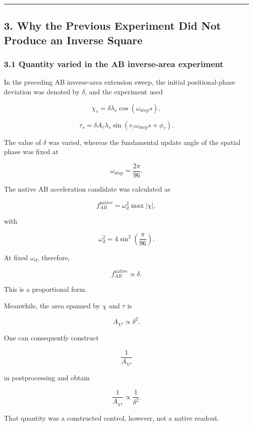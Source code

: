 \documentclass[
  10pt,
  a4paper,
]{article}
\begin{document}
\begin{center}\rule{0.5\linewidth}{0.5pt}\end{center}

\subsection{3. Why the Previous Experiment Did Not Produce an Inverse
Square}\label{why-the-previous-experiment-did-not-produce-an-inverse-square}

\subsubsection{3.1 Quantity varied in the AB inverse-area
experiment}\label{quantity-varied-in-the-ab-inverse-area-experiment}

In the preceding AB inverse-area extension sweep, the initial
positional-phase deviation was denoted by \(\delta\), and the experiment
used

\[
\chi_s
=\delta\lambda_s\cos(\omega_{\mathrm{step}}s),
\]

\[
\tau_s
=\delta A_\tau\lambda_s
\sin(r_\tau\omega_{\mathrm{step}}s+\phi_\tau).
\]

The value of \(\delta\) was varied, whereas the fundamental update angle
of the spatial phase was fixed at

\[
\omega_{\mathrm{step}}
=\frac{2\pi}{96}.
\]

The native AB acceleration candidate was calculated as

\[
f_{AB}^{\mathrm{native}}
=\omega_d^2\max|\chi|,
\]

with

\[
\omega_d^2
=4\sin^2\left(\frac{\pi}{96}\right).
\]

At fixed \(\omega_d\), therefore,

\[
f_{AB}^{\mathrm{native}}\propto\delta.
\]

This is a proportional form.

Meanwhile, the area spanned by \(\chi\) and \(\tau\) is

\[
A_{\chi\tau}\propto\delta^2.
\]

One can consequently construct

\[
\frac{1}{A_{\chi\tau}}
\]

in postprocessing and obtain

\[
\frac{1}{A_{\chi\tau}}
\propto\frac{1}{\delta^2}.
\]

That quantity was a constructed control, however, not a native readout.
\end{document}
